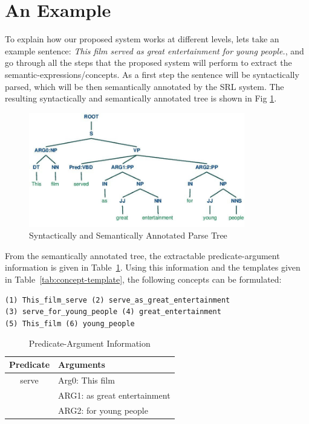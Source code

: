 \documentclass[runningheads,a4paper]{llncs}
\begin{document}
\section{An Example} 
To explain how our proposed system works at different levels, lets take an example sentence: \textit{This film served as great entertainment for young people.}, and go through all the steps that the proposed system will perform to extract the semantic-expressions/concepts. As a first step the sentence will be syntactically parsed, which will be then semantically annotated by the SRL system. The resulting syntactically and semantically annotated tree is shown in Fig \ref{fig:parse-tree}.
\begin{figure}[!h]
\centering
\includegraphics[width=.8\textwidth,height=5cm]{parse-tree6.jpg}
\caption{Syntactically and Semantically Annotated Parse Tree}
\label{fig:parse-tree}
\end{figure} 
From the semantically annotated tree, the extractable predicate-argument information is given in Table~\ref{tab:pred-arg-info}. Using this information and the templates given in Table~\ref{tab:concept-template}, the following concepts can be formulated:
\begin{verbatim}
(1) This_film_serve (2) serve_as_great_entertainment
(3) serve_for_young_people (4) great_entertainment
(5) This_film (6) young_people
\end{verbatim}
\begin{table}[!h]
\centering
\begin{tabular}{cp{10cm}}
\hline Predicate &  Arguments\\ 
\hline serve  & Arg0: This film \\
 & ARG1: as great entertainment \\
 & ARG2: for young people \\
\hline 
\end{tabular} 
\caption{Predicate-Argument Information}
\label{tab:pred-arg-info}
\end{table}    
\end{document}
